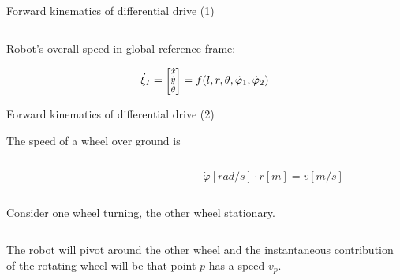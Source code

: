 \documentclass[compress]{beamer}
\newcommand{\colvec}[2][.8]{%
  \scalebox{#1}{%
    \renewcommand{\arraystretch}{.8}%
    $\begin{bmatrix}#2\end{bmatrix}$%
  }
}
\begin{document}
\begin{frame}{Forward kinematics of differential drive (1)}
\begin{columns}
\begin{column}{0.5\linewidth}
{\begin{tikzpicture}
                \end{tikzpicture}
            }

        \end{column}
    \end{columns}

    Robot's overall speed in global reference frame:

    \[
        \dot\xi_I = \colvec{\dot{x} \\ \dot{y} \\ \dot\theta} = f(l, r, \theta,
        \dot\varphi_1, \dot\varphi_2)
        \]

\end{frame}

\begin{frame}{Forward kinematics of differential drive (2)}

    The speed of a wheel over ground is

    \begin{columns}
        \begin{column}{0.5\linewidth}

        \end{column}
        \begin{column}{0.5\linewidth}
            \[
                \dot\varphi [rad/s]\cdot r [m] = v [m/s]
            \]
        \end{column}
    \end{columns}
    Consider one wheel turning, the other wheel stationary.
    \vspace{1em}

    \begin{columns}
        \begin{column}{0.5\linewidth}
The robot will pivot around the other wheel and the instantaneous
            contribution of the rotating wheel will be that point $p$ has a
            speed $v_p$.


\end{column}
\end{columns}
\end{frame}
\end{document}
